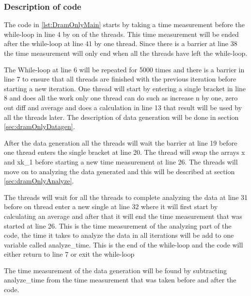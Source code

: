 \documentclass[12pt,a4paper,USenglish]{article}      %
\begin{document}
\subsubsection{Description of code}
The code in \ref{lst:DramOnlyMain} starts by taking a time measurement before the while-loop in line 4 by on of the threads. This time measurement will be ended after the while-loop at line 41 by one thread. Since there is a barrier at line 38 the time measurement will only end when all the threads have left the while-loop.

The While-loop at line 6 will be repeated for 5000 times and there is a barrier in line 7 to ensure that all threads are finished with the previous iteration before starting a new iteration. One thread will start by entering a single bracket in line 8 and does all the work only one thread can do such as increase n by one, zero out diff and average and does a calculation in line 13 that result will be used by all the threads later.
The description of data generation will be done in section \ref{sec:dramOnlyDatagen}.

After the data generation all the threads will wait the barrier at line 19 before one thread enters the single bracket at line 20. The thread will swap the arrays x and xk\_1 before starting a new time measurement at line 26.
The threads will move on to analyzing the data generated and this will be described at section \ref{sec:dramOnlyAnalyze}.

The threads will wait for all the threads to complete analyzing the data at line 31 before on thread enter a new single at line 32 where it will first start by calculating an average and after that it will end the time measurement that was started at line 26. This is the time measurement of the analyzing part of the code, the time it takes to analyze the data in all iterations will be add to one variable called analyze\_time. This is the end of the while-loop and the code will either return to line 7 or exit the while-loop

The time measurement of the data generation will be found by subtracting analyze\_time from the time measurement that was taken before and after the code. 
\end{document}
